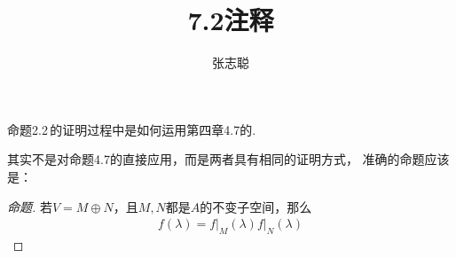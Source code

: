 \documentclass{article}
\begin{document}
\title{7.2注释}
\author{张志聪}
\maketitle

\begin{zremark}
  命题2.2$\, $的证明过程中是如何运用第四章4.7的.
\end{zremark}

其实不是对命题4.7的直接应用，而是两者具有相同的证明方式，
准确的命题应该是：

\begin{proof}[命题]
  若$V = M \oplus N$，且$M,N$都是$A$的不变子空间，那么
  \begin{align*}
    f(\lambda) = f\big|_M(\lambda) f\big|_N(\lambda)
  \end{align*}
\end{proof}
\end{document}
